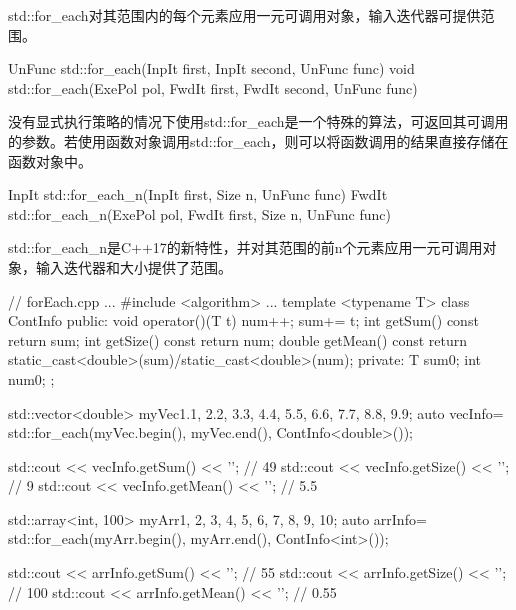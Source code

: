std::for\_each对其范围内的每个元素应用一元可调用对象，输入迭代器可提供范围。

\begin{cpp}
UnFunc std::for_each(InpIt first, InpIt second, UnFunc func)
void std::for_each(ExePol pol, FwdIt first, FwdIt second, UnFunc func)
\end{cpp}

没有显式执行策略的情况下使用std::for\_each是一个特殊的算法，可返回其可调用的参数。若使用函数对象调用std::for\_each，则可以将函数调用的结果直接存储在函数对象中。

\begin{cpp}
InpIt std::for_each_n(InpIt first, Size n, UnFunc func) FwdIt std::for_each_n(ExePol pol, FwdIt first, Size n, UnFunc func)
\end{cpp}

std::for\_each\_n是C++17的新特性，并对其范围的前n个元素应用一元可调用对象，输入迭代器和大小提供了范围。


\begin{cpp}
// forEach.cpp
...
#include <algorithm>
...
template <typename T>
class ContInfo{
public:
	void operator()(T t){
		num++;
		sum+= t;
	}
	int getSum() const{ return sum; }
	int getSize() const{ return num; }
	double getMean() const{
		return static_cast<double>(sum)/static_cast<double>(num);
	}
private:
	T sum{0};
	int num{0};
};

std::vector<double> myVec{1.1, 2.2, 3.3, 4.4, 5.5, 6.6, 7.7, 8.8, 9.9};
auto vecInfo= std::for_each(myVec.begin(), myVec.end(), ContInfo<double>());

std::cout << vecInfo.getSum() << '\n'; // 49
std::cout << vecInfo.getSize() << '\n'; // 9
std::cout << vecInfo.getMean() << '\n'; // 5.5

std::array<int, 100> myArr{1, 2, 3, 4, 5, 6, 7, 8, 9, 10};
auto arrInfo= std::for_each(myArr.begin(), myArr.end(), ContInfo<int>());

std::cout << arrInfo.getSum() << '\n'; // 55
std::cout << arrInfo.getSize() << '\n'; // 100
std::cout << arrInfo.getMean() << '\n'; // 0.55
\end{cpp}

























